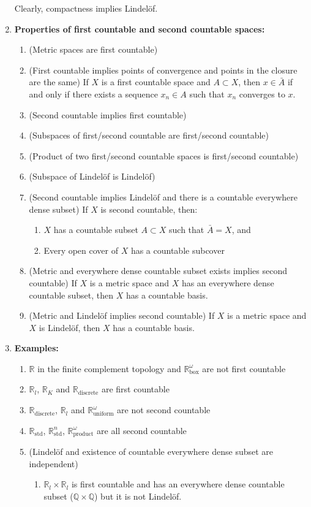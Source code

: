 \documentclass[letterpaper, 12pt]{book}
\newcommand{\RR}{\mathbb{R}}
\newcommand{\QQ}{\mathbb{Q}}
\begin{document}
\begin{enumerate}[resume]
        Clearly, compactness implies Lindel\"of.
    \item \textbf{Properties of first countable and second countable spaces:}
        \begin{enumerate}
            \item (Metric spaces are first countable)
            \item (First countable implies points of convergence and points in the closure are the same) If $X$ is a first countable space and $A\subset X$, then $x\in \bar{A}$ if and only if there exists a sequence $x_n\in A$ such that $x_n$ converges to $x$.
            \item (Second countable implies first countable)
            \item (Subspaces of first/second countable are first/second countable)
            \item (Product of two first/second countable spaces is first/second countable)
            \item (Subspace of Lindel\"of is Lindel\"of)
            \item (Second countable implies Lindel\"of and there is a countable everywhere dense subset) If $X$ is second countable, then:
                \begin{enumerate}
                \item $X$ has a countable subset $A\subset X$ such that $\bar{A} = X$, and
                \item Every open cover of $X$ has a countable subcover
                \end{enumerate}
            \item (Metric and everywhere dense countable subset exists implies second countable) If $X$ is a metric space and $X$ has an everywhere dense countable subset, then $X$ has a countable basis.
            \item (Metric and Lindel\"of implies second countable) If $X$ is a metric space and $X$ is Lindel\"of, then $X$ has a countable basis.
        \end{enumerate}
    \item \textbf{Examples:}
        \begin{enumerate}
        \item $\RR$ in the finite complement topology and $\RR^\omega_\text{box}$ are not first countable
        \item $\RR_l$, $\RR_K$ and $\RR_\text{discrete}$ are first countable
        \item $\RR_\text{discrete}$, $\RR_l$ and $\RR^\omega_\text{uniform}$ are not second countable
        \item $\RR_\text{std}$, $\RR^n_\text{std}$, $\RR^\omega_\text{product}$ are all second countable
        \item (Lindel\"of and existence of countable everywhere dense subset are independent)
            \begin{enumerate}
            \item $\RR_l\times\RR_l$ is first countable and has an everywhere dense countable subset ($\QQ\times\QQ$) but it is not Lindel\"of.


\end{enumerate}
\end{enumerate}
\end{enumerate}
\end{document}
